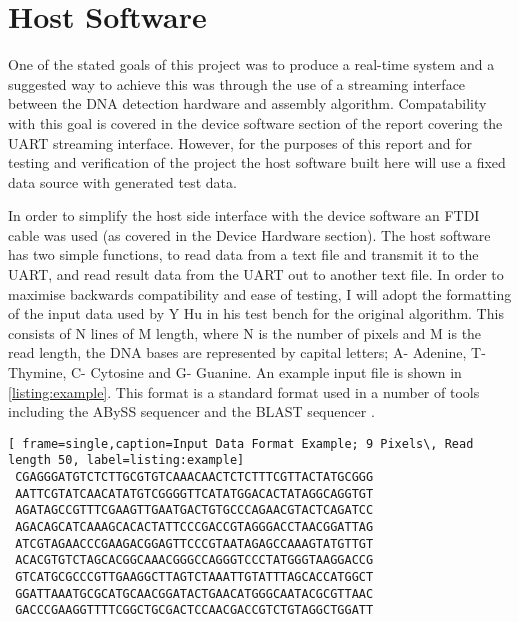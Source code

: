 \section{Host Software}
One of the stated goals of this project was to produce a real-time system and a suggested way to achieve this was through the use of a streaming interface between the DNA detection hardware and assembly algorithm. Compatability with this goal is covered in the device software section of the report covering the UART streaming interface. However, for the purposes of this report and for testing and verification of the project the host software built here will use a fixed data source with generated test data. 

In order to simplify the host side interface with the device software an FTDI cable was used (as covered in the Device Hardware section). The host software has two simple functions, to read data from a text file and transmit it to the UART, and read result data from the UART out to another text file. In order to maximise backwards compatibility and ease of testing, I will adopt the formatting of the input data used by Y Hu in his test bench for the original algorithm. This consists of N lines of M length, where N is the number of pixels and M is the read length, the DNA bases are represented by capital letters; A- Adenine, T- Thymine, C- Cytosine and G- Guanine. An example input file is shown in \ref{listing:example}. This format is a standard format used in a number of tools including the ABySS sequencer and the BLAST sequencer \cite{ABySS}\cite{BLAST}. \\


\begin{minipage}{0.8\textwidth}

\begin{center}

 \lstset{numbers=left, showspaces=false, showstringspaces=false, tabsize=4, basicstyle=\tt, breaklines=true, captionpos=b, numbersep=5pt }
\begin{lstlisting}[ frame=single,caption=Input Data Format Example; 9 Pixels\, Read length 50, label=listing:example]
 CGAGGGATGTCTCTTGCGTGTCAAACAACTCTCTTTCGTTACTATGCGGG
 AATTCGTATCAACATATGTCGGGGTTCATATGGACACTATAGGCAGGTGT
 AGATAGCCGTTTCGAAGTTGAATGACTGTGCCCAGAACGTACTCAGATCC
 AGACAGCATCAAAGCACACTATTCCCGACCGTAGGGACCTAACGGATTAG
 ATCGTAGAACCCGAAGACGGAGTTCCCGTAATAGAGCCAAAGTATGTTGT
 ACACGTGTCTAGCACGGCAAACGGGCCAGGGTCCCTATGGGTAAGGACCG
 GTCATGCGCCCGTTGAAGGCTTAGTCTAAATTGTATTTAGCACCATGGCT
 GGATTAAATGCGCATGCAACGGATACTGAACATGGGCAATACGCGTTAAC
 GACCCGAAGGTTTTCGGCTGCGACTCCAACGACCGTCTGTAGGCTGGATT
\end{lstlisting}

\end{center}
\end{minipage}

